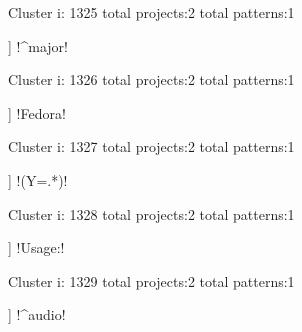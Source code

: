 Cluster i: 1325
total projects:2
total patterns:1
\begin{multicols}{1}
\begin{description}[noitemsep,topsep=0pt]
\item [[2] ] \cverb!^major!
\end{description}
\end{multicols}







Cluster i: 1326
total projects:2
total patterns:1
\begin{multicols}{1}
\begin{description}[noitemsep,topsep=0pt]
\item [[2] ] \cverb!Fedora!
\end{description}
\end{multicols}







Cluster i: 1327
total projects:2
total patterns:1
\begin{multicols}{1}
\begin{description}[noitemsep,topsep=0pt]
\item [[2] ] \cverb!(Y=.*)!
\end{description}
\end{multicols}







Cluster i: 1328
total projects:2
total patterns:1
\begin{multicols}{1}
\begin{description}[noitemsep,topsep=0pt]
\item [[2] ] \cverb!Usage:!
\end{description}
\end{multicols}







Cluster i: 1329
total projects:2
total patterns:1
\begin{multicols}{1}
\begin{description}[noitemsep,topsep=0pt]
\item [[2] ] \cverb!^audio!
\end{description}
\end{multicols}







